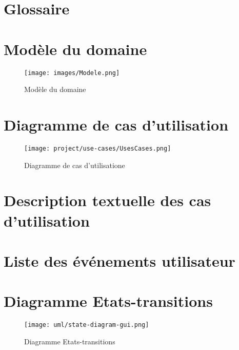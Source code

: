 \documentclass[a4paper,10pt]{article}
\begin{document}
\begin{titlepage}
  
\end{titlepage}
\tableofcontents
\pagebreak

\section{Glossaire}


\FloatBarrier
\section{Modèle du domaine}
\begin{figure}[h!]
  \begin{center}
    \texttt{[image: images/Modele.png]}
    \caption{Modèle du domaine}
    \label{fig:modele}
  \end{center}
\end{figure}

\FloatBarrier
\section{Diagramme de cas d'utilisation}
\begin{figure}[h!]
  \begin{center}
    \texttt{[image: project/use-cases/UsesCases.png]}
    \caption{Diagramme de cas d'utilisatione}
    \label{fig:useCase}
  \end{center}
\end{figure}

\FloatBarrier
\section{Description textuelle des cas d’utilisation}




\FloatBarrier
\section{Liste des événements utilisateur}  

\FloatBarrier
\section{Diagramme Etats-transitions}
\begin{figure}[h!]
  \begin{center}
    \texttt{[image: uml/state-diagram-gui.png]}
    \caption{Diagramme Etats-transitions}
    \label{fig:stateGui}
  \end{center}
\end{figure}
\end{document}
